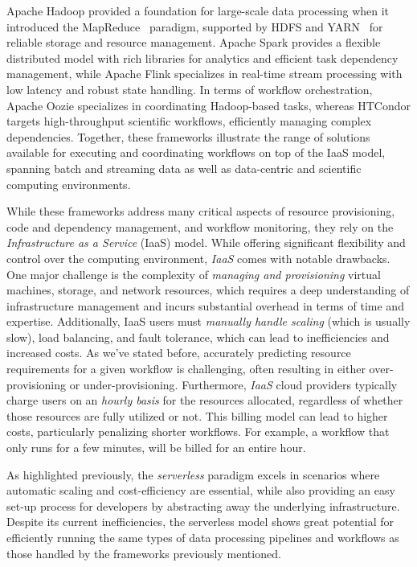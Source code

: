 Apache Hadoop provided a foundation for large-scale data processing when it introduced the MapReduce~\cite{mapreduce} paradigm, supported by HDFS and YARN~\cite{yarn} for reliable storage and resource management. Apache Spark provides a flexible distributed model with rich libraries for analytics and efficient task dependency management, while Apache Flink specializes in real-time stream processing with low latency and robust state handling. In terms of workflow orchestration, Apache Oozie specializes in coordinating Hadoop-based tasks, whereas HTCondor targets high-throughput scientific workflows, efficiently managing complex dependencies. Together, these frameworks illustrate the range of solutions available for executing and coordinating workflows on top of the IaaS model, spanning batch and streaming data as well as data-centric and scientific computing environments.

While these frameworks address many critical aspects of resource provisioning, code and dependency management, and workflow monitoring, they rely on the \textit{Infrastructure as a Service} (IaaS) model. While offering significant flexibility and control over the computing environment, \textit{IaaS} comes with notable drawbacks. One major challenge is the complexity of \textit{managing and provisioning} virtual machines, storage, and network resources, which requires a deep understanding of infrastructure management and incurs substantial overhead in terms of time and expertise. Additionally, IaaS users must \textit{manually handle scaling} (which is usually slow), load balancing, and fault tolerance, which can lead to inefficiencies and increased costs. As we've stated before, accurately predicting resource requirements for a given workflow is challenging, often resulting in either over-provisioning or under-provisioning. Furthermore, \textit{IaaS} cloud providers typically charge users on an \textit{hourly basis} for the resources allocated, regardless of whether those resources are fully utilized or not. This billing model can lead to higher costs, particularly penalizing shorter workflows. For example, a workflow that only runs for a few minutes, will be billed for an entire hour.

As highlighted previously, the \textit{serverless} paradigm excels in scenarios where automatic scaling and cost-efficiency are essential, while also providing an easy set-up process for developers by abstracting away the underlying infrastructure. Despite its current inefficiencies, the serverless model shows great potential for efficiently running the same types of data processing pipelines and workflows as those handled by the frameworks previously mentioned.


